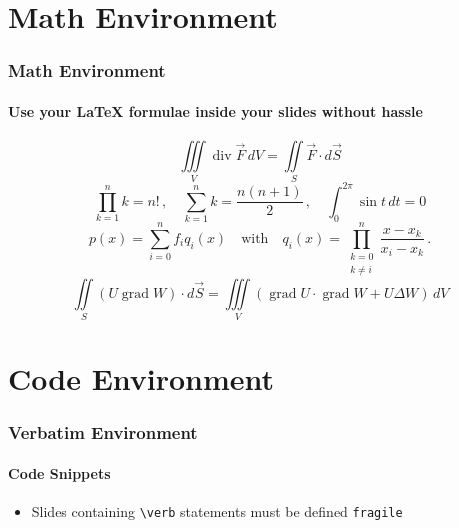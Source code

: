 \section{Math Environment}
\begin{frame}
        \frametitle{Math Environment}
        \framesubtitle{Use your {\LaTeX} formulae inside your slides without hassle}
        \[
            \iiint\limits_V \operatorname{div} \vec{F} \, dV
            = \iint\limits_S \vec{F}\cdot d\vec{S}
        \]
        \[
         \prod_{k=1}^n k = n! \,,\quad \sum_{k=1}^n k=\frac{n(n+1)}{2}\,,
          \quad \int_0^{2\pi}\sin t\,dt=0
        \]
        \[
            p(x)=\sum_{i=0}^n f_{i}q_{i}(x) \quad\mbox{with}\quad
            q_{i}(x)=\prod_{\substack{k=0 \\ k\neq i}}^n
            \frac{x-x_{k}}{x_{i}-x_{k}}\,.
        \]
        \[
            \iint\limits_S (U \operatorname{grad} W)\cdot d\vec{S}
            =\iiint\limits_V (\operatorname{grad} U\cdot
             \operatorname{grad} W +U\Delta W)\,dV
        \]
\end{frame}

\section{Code Environment}
\begin{frame}[fragile]
        \frametitle{Verbatim Environment}
        \framesubtitle{Code Snippets}
        \begin{itemize}
      \item Slides containing \verb!\verb! statements must be defined \verb+fragile+
    \end{itemize}
    \scriptsize
    
\end{frame}


